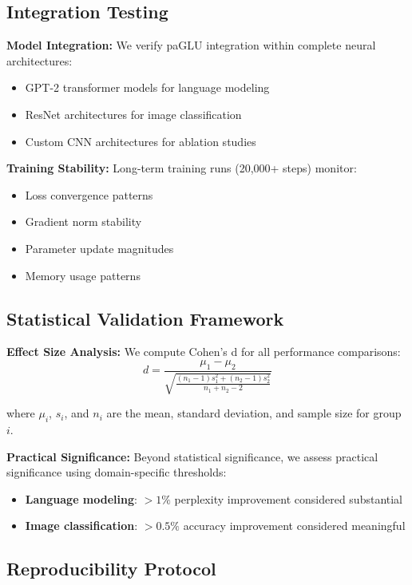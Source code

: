 \documentclass[11pt]{article}
\begin{document}
\subsection{Integration Testing}

\textbf{Model Integration:} We verify paGLU integration within complete neural architectures:
\begin{itemize}
    \item GPT-2 transformer models for language modeling
    \item ResNet architectures for image classification
    \item Custom CNN architectures for ablation studies
\end{itemize}

\textbf{Training Stability:} Long-term training runs (20,000+ steps) monitor:
\begin{itemize}
    \item Loss convergence patterns
    \item Gradient norm stability
    \item Parameter update magnitudes
    \item Memory usage patterns
\end{itemize}

\subsection{Statistical Validation Framework}

\textbf{Effect Size Analysis:} We compute Cohen's d for all performance comparisons:
\begin{equation}
d = \frac{\mu_1 - \mu_2}{\sqrt{\frac{(n_1-1)s_1^2 + (n_2-1)s_2^2}{n_1+n_2-2}}}
\label{eq:cohens_d}
\end{equation}

where $\mu_i$, $s_i$, and $n_i$ are the mean, standard deviation, and sample size for group $i$.

\textbf{Practical Significance:} Beyond statistical significance, we assess practical significance using domain-specific thresholds:
\begin{itemize}
    \item \textbf{Language modeling}: $>1\%$ perplexity improvement considered substantial
    \item \textbf{Image classification}: $>0.5\%$ accuracy improvement considered meaningful
\end{itemize}

\subsection{Reproducibility Protocol}
\end{document}
